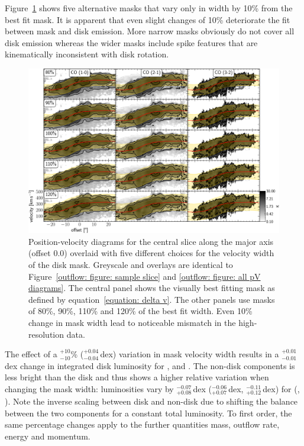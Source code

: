 Figure~\ref{outflow: figure: disk mask width} shows five alternative masks that vary only in width by 10\% from the best fit mask. It is apparent that even slight changes of 10\% deteriorate the fit between mask and disk emission. More narrow masks obviously do not cover all disk emission whereas the wider masks include spike features that are kinematically inconsistent with disk rotation.

\begin{figure}
    \centering
    \includegraphics[width=\textwidth]{images/chapters/papers/outflow/outflow_figB1.pdf}
    \caption[Effect of varying pV slice width]{Position-velocity diagrams for the central slice along the major axis (offset 0.0\arcsec) overlaid with five different choices for the velocity width of the disk mask. Greyscale and overlays are identical to Figure~\ref{outflow: figure: sample slice} and \ref{outflow: figure: all pV diagrams}. The central panel shows the visually best fitting mask as defined by equation~\ref{equation: delta v}. The other panels use masks of 80\%, 90\%, 110\% and 120\% of the best fit width. Even 10\% change in mask width lead to noticeable mismatch in the high-resolution  data.}
    \label{outflow: figure: disk mask width}
\end{figure}{}

The effect of a $^{+10}_{-10}$\% ($^{+0.04}_{-0.04}$\,dex) variation in mask velocity width results in a $^{+0.01}_{-0.01}$\,dex change in integrated disk luminosity for ,  and . The non-disk components is less bright than the disk and thus shows a higher relative variation when changing the mask width: luminosities vary by $^{-0.07}_{+0.08}$\,dex ($^{-0.06}_{+0.07}$\,dex, $^{-0.11}_{+0.12}$\,dex) for  (, ). Note the inverse scaling between disk and non-disk due to shifting the balance between the two components for a constant total luminosity. To first order, the same percentage changes apply to the further quantities mass, outflow rate, energy and momentum.



